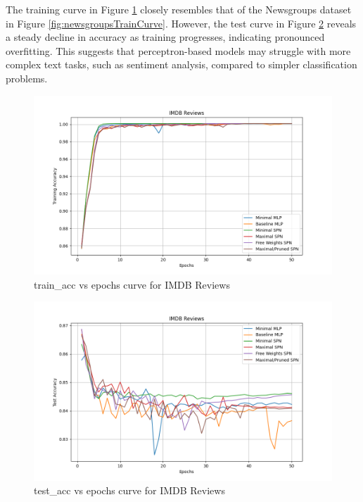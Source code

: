 The training curve in Figure \ref{fig:imdbTrainCurve} closely resembles that of the Newsgroups dataset in Figure \ref{fig:newsgroupsTrainCurve}. However, the test curve in Figure \ref{fig:imdbTestCurve} reveals a steady decline in accuracy as training progresses, indicating pronounced overfitting. This suggests that perceptron-based models may struggle with more complex text tasks, such as sentiment analysis, compared to simpler classification problems.

\begin{figure}[H]
    \centering
    \includegraphics[width=\linewidth]{Figures/Results/IMDB/training_accuracy_plot.png} %
    \captionsetup{width=\linewidth}
    \caption{train\_acc vs epochs curve for IMDB Reviews}
    \label{fig:imdbTrainCurve}
\end{figure}

\begin{figure}[H]
    \centering
    \includegraphics[width=\linewidth]{Figures/Results/IMDB/test_accuracy_plot.png} %
    \captionsetup{width=\linewidth}
    \caption{test\_acc vs epochs curve for IMDB Reviews}
    \label{fig:imdbTestCurve}
\end{figure}

